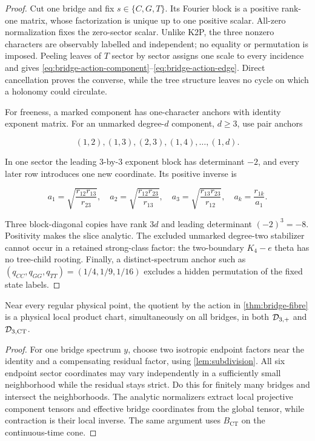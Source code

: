 \begin{proof}
Cut one bridge and fix \(s\in\{C,G,T\}\).  Its Fourier block is a positive
rank-one matrix, whose factorization is unique up to one positive scalar.
All-zero normalization fixes the zero-sector scalar.  Unlike K2P, the three
nonzero characters are observably labelled and independent; no equality or
permutation is imposed.  Peeling leaves of \(T\) sector by sector assigns one
scale to every incidence and gives
\eqref{eq:bridge-action-component}--\eqref{eq:bridge-action-edge}.  Direct
cancellation proves the converse, while the tree structure leaves no cycle
on which a holonomy could circulate.

For freeness, a marked component has one-character anchors with identity
exponent matrix.  For an unmarked degree-\(d\) component, \(d\ge3\), use pair
anchors

\[
 (1,2),(1,3),(2,3),(1,4),\ldots,(1,d).
\]

In one sector the leading \(3\)-by-\(3\) exponent block has determinant
\(-2\), and every later row introduces one new coordinate.  Its positive
inverse is

\begin{equation}\label{eq:bridge-normalizer}
 a_1=\sqrt{\frac{r_{12}r_{13}}{r_{23}}},\quad
 a_2=\sqrt{\frac{r_{12}r_{23}}{r_{13}}},\quad
 a_3=\sqrt{\frac{r_{13}r_{23}}{r_{12}}},\quad
 a_k=\frac{r_{1k}}{a_1}.
\end{equation}

Three block-diagonal copies have rank \(3d\) and leading determinant
\((-2)^3=-8\).  Positivity makes the slice analytic.  The excluded unmarked
degree-two stabilizer cannot occur in a retained strong-class factor: the
two-boundary \(K_4-e\) theta has no tree-child rooting.  Finally, a
distinct-spectrum anchor such as
\((q_{CC},q_{GG},q_{TT})=(1/4,1/9,1/16)\) excludes a hidden permutation of
the fixed state labels.
\end{proof}

\begin{lemma}\label{lem:physical-product}
Near every regular physical point, the quotient by the action in
\cref{thm:bridge-fibre} is a physical local product chart, simultaneously on
all bridges, in both \(\mathcal D_{3,+}\) and \(\mathcal D_{3,\mathrm{CT}}\).
\end{lemma}

\begin{proof}
For one bridge spectrum \(y\), choose two isotropic endpoint factors near the
identity and a compensating residual factor, using
\cref{lem:subdivision}.  All six endpoint sector coordinates may vary
independently in a sufficiently small neighborhood while the residual stays
strict.  Do this for finitely many bridges and intersect the neighborhoods.
The analytic normalizers extract local projective component tensors and
effective bridge coordinates from the global tensor, while contraction is
their local inverse.  The same argument uses \(B_{\mathrm{CT}}\) on the
continuous-time cone.
\end{proof}

